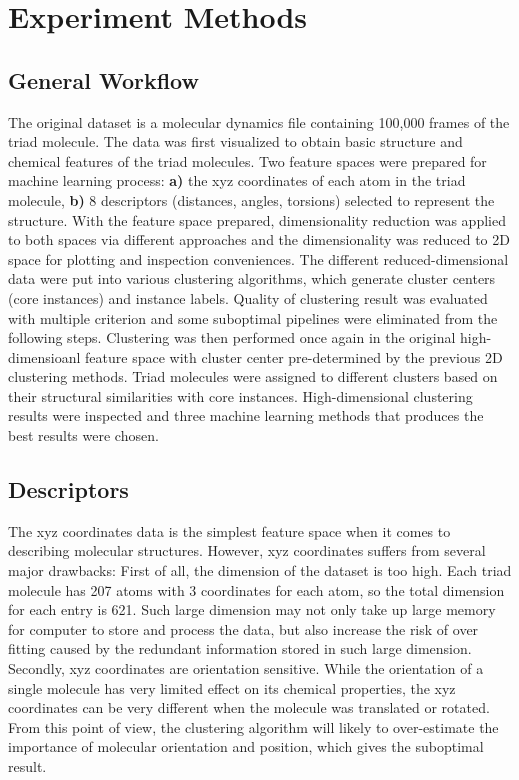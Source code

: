 \documentclass[a4paper]{article}
\begin{document}
\section{Experiment Methods}

\subsection{General Workflow}
The original dataset is a molecular dynamics file containing 100,000 frames of the triad molecule. The data was first visualized to obtain basic structure and chemical features of the triad molecules. Two feature spaces were prepared for machine learning process: \textbf{a)} the xyz coordinates of each atom in the triad molecule, \textbf{b)} 8 descriptors (distances, angles, torsions) selected to represent the structure. With the feature space prepared, dimensionality reduction was applied to both spaces via different approaches and the dimensionality was reduced to 2D space for plotting and inspection conveniences. The different reduced-dimensional data were put into various clustering algorithms, which generate cluster centers (core instances) and instance labels. Quality of clustering result was evaluated with multiple criterion and some suboptimal pipelines were eliminated from the following steps. Clustering was then performed once again in the original high-dimensioanl feature space with cluster center pre-determined by the previous 2D clustering methods. Triad molecules were assigned to different clusters based on their structural similarities with core instances. High-dimensional clustering results were inspected and three machine learning methods that produces the best results were chosen.

\subsection{Descriptors} \label{sec: descriptors}
The xyz coordinates data is the simplest feature space when it comes to describing molecular structures. However, xyz coordinates suffers from several major drawbacks: First of all, the dimension of the dataset is too high. Each triad molecule has 207 atoms with 3 coordinates for each atom, so the total dimension for each entry is 621. Such large dimension may not only take up large memory for computer to store and process the data, but also increase the risk of over fitting caused by the redundant information stored in such large dimension. Secondly, xyz coordinates are orientation sensitive. While the orientation of a single molecule has very limited effect on its chemical properties, the xyz coordinates can be very different when the molecule was translated or rotated. From this point of view, the clustering algorithm will likely to over-estimate the importance of molecular orientation and position, which gives the suboptimal result.
\end{document}
